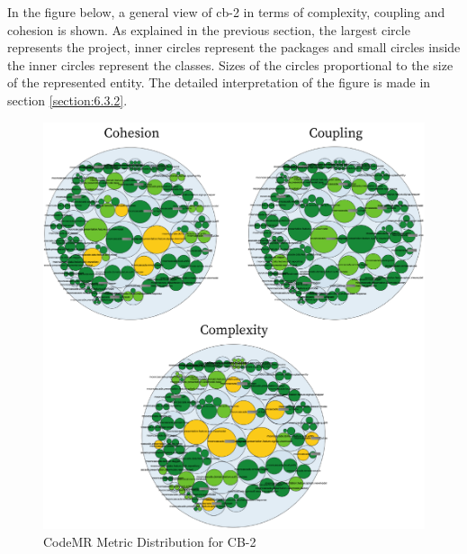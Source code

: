In the figure below, a general view of cb-2 in terms of complexity, coupling and cohesion is shown. As explained in the previous section, the largest circle represents the project, inner circles represent the packages and small circles inside the inner circles represent the classes. Sizes of the circles proportional to the size of the represented entity. The detailed interpretation of the figure is made in section \ref{section:6.3.2}.
\begin{figure}[ht!]
    \centering
    \includegraphics[scale=1.1]{figures/cb-2-package.png}
    \caption{CodeMR Metric Distribution for CB-2}
    \label{fig:cb-2-package}
\end{figure}
\FloatBarrier





